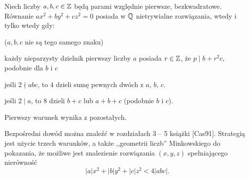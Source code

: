 \begin{fakt}
	Niech liczby $a,b,c \in \mathbb Z$ będą parami względnie pierwsze, bezkwadratowe.
	Równanie $ax^2+by^2+cz^2 = 0$ posiada w $\mathbb Q$ nietrywialne rozwiązania, wtedy i tylko wtedy gdy:
	\begin{enumx}
		\item ($a,b,c$ nie są tego samego znaku)
		\item każdy nieparzysty dzielnik pierwszy liczby $a$ posiada $r \in \mathbb Z$, że $p \mid b+r^2c$, podobnie dla $b$ i $c$
		\item jeśli $2 \nmid abc$, to $4$ dzieli sumę pewnych dwóch z $a$, $b$, $c$.
		\item jeśli $2 \mid a$, to $8$ dzieli $b+c$ lub $a+b+c$ (podobnie $b$ i $c$).
	\end{enumx}

	Pierwszy warunek wynika z pozostałych.
\end{fakt}

Bezpośredni dowód można znaleźć w rozdziałach 3 -- 5 książki [Cas91].
Strategią jest użycie trzech warunków, a także ,,geometrii liczb'' Minkowskiego do pokazania, że możliwe jest znalezienie rozwiązania $(x, y, z)$ spełniającego nierówność
\[
	|a| x^2 + |b| y^2 + |c| z^2 < 4 |abc|.
\]
